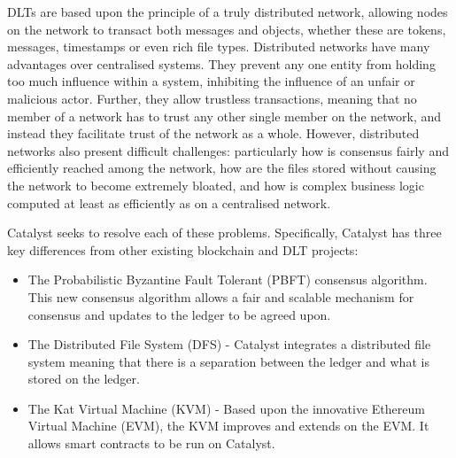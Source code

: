 DLTs are based upon the principle of a truly distributed network, allowing nodes on the network to transact both messages and objects, whether these are tokens, messages, timestamps or even rich file types. Distributed networks have many advantages over centralised systems. They prevent any one entity from holding too much influence within a system, inhibiting the influence of an unfair or malicious actor. Further, they allow trustless transactions, meaning that no member of a network has to trust any other single member on the network, and instead they facilitate trust of the network as a whole. However, distributed networks also present difficult challenges: particularly how is consensus fairly and efficiently reached among the network, how are the files stored without causing the network to become extremely bloated, and how is complex business logic computed at least as efficiently as on a centralised network.

Catalyst seeks to resolve each of these problems. Specifically, Catalyst has three key differences from other existing blockchain and DLT projects:

\begin{itemize}
\item The Probabilistic Byzantine Fault Tolerant (PBFT) consensus algorithm. This new consensus algorithm allows a fair and scalable mechanism for consensus and updates to the ledger to be agreed upon.
\item The Distributed File System (DFS) - Catalyst integrates a distributed file system meaning that there is a separation between the ledger and what is stored on the ledger.
\item The Kat Virtual Machine (KVM) - Based upon the innovative Ethereum Virtual Machine (EVM), the KVM improves and extends on the EVM. It allows smart contracts to be run on Catalyst. \\
\end{itemize}

